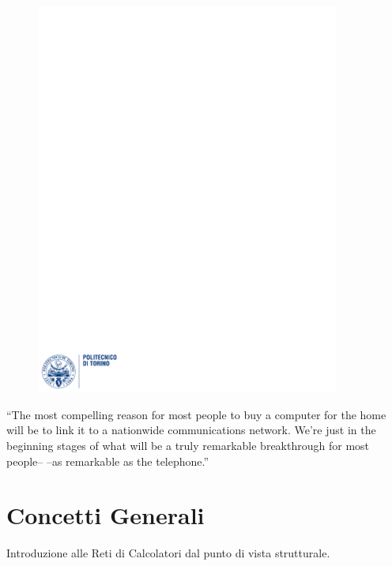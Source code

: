 \documentclass[12pt]{article}
\begin{document}
\begin{figure}
  \centering
  \includegraphics[width=10cm]{images/polito.pdf}
\end{figure}

\maketitle
\newpage
\tableofcontents
\newpage
``The most compelling reason for most people to buy a computer for the home will be to link it to a nationwide communications network. We’re just in the beginning stages of what will be a truly remarkable breakthrough for most people– –as remarkable as the telephone.''\\
\newpage

\section{Concetti Generali}\label{subsubsec}
Introduzione alle Reti di Calcolatori dal punto di vista strutturale.
\end{document}
